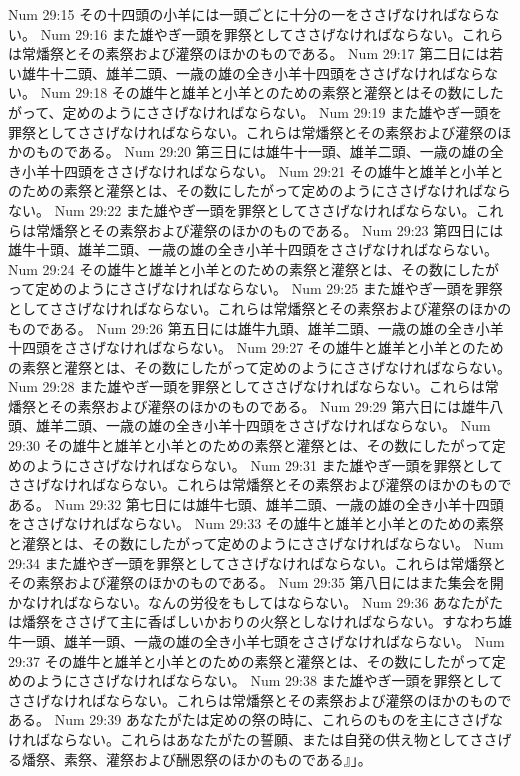 Num 29:15  その十四頭の小羊には一頭ごとに十分の一をささげなければならない。
Num 29:16  また雄やぎ一頭を罪祭としてささげなければならない。これらは常燔祭とその素祭および灌祭のほかのものである。
Num 29:17  第二日には若い雄牛十二頭、雄羊二頭、一歳の雄の全き小羊十四頭をささげなければならない。
Num 29:18  その雄牛と雄羊と小羊とのための素祭と灌祭とはその数にしたがって、定めのようにささげなければならない。
Num 29:19  また雄やぎ一頭を罪祭としてささげなければならない。これらは常燔祭とその素祭および灌祭のほかのものである。
Num 29:20  第三日には雄牛十一頭、雄羊二頭、一歳の雄の全き小羊十四頭をささげなければならない。
Num 29:21  その雄牛と雄羊と小羊とのための素祭と灌祭とは、その数にしたがって定めのようにささげなければならない。
Num 29:22  また雄やぎ一頭を罪祭としてささげなければならない。これらは常燔祭とその素祭および灌祭のほかのものである。
Num 29:23  第四日には雄牛十頭、雄羊二頭、一歳の雄の全き小羊十四頭をささげなければならない。
Num 29:24  その雄牛と雄羊と小羊とのための素祭と灌祭とは、その数にしたがって定めのようにささげなければならない。
Num 29:25  また雄やぎ一頭を罪祭としてささげなければならない。これらは常燔祭とその素祭および灌祭のほかのものである。
Num 29:26  第五日には雄牛九頭、雄羊二頭、一歳の雄の全き小羊十四頭をささげなければならない。
Num 29:27  その雄牛と雄羊と小羊とのための素祭と灌祭とは、その数にしたがって定めのようにささげなければならない。
Num 29:28  また雄やぎ一頭を罪祭としてささげなければならない。これらは常燔祭とその素祭および灌祭のほかのものである。
Num 29:29  第六日には雄牛八頭、雄羊二頭、一歳の雄の全き小羊十四頭をささげなければならない。
Num 29:30  その雄牛と雄羊と小羊とのための素祭と灌祭とは、その数にしたがって定めのようにささげなければならない。
Num 29:31  また雄やぎ一頭を罪祭としてささげなければならない。これらは常燔祭とその素祭および灌祭のほかのものである。
Num 29:32  第七日には雄牛七頭、雄羊二頭、一歳の雄の全き小羊十四頭をささげなければならない。
Num 29:33  その雄牛と雄羊と小羊とのための素祭と灌祭とは、その数にしたがって定めのようにささげなければならない。
Num 29:34  また雄やぎ一頭を罪祭としてささげなければならない。これらは常燔祭とその素祭および灌祭のほかのものである。
Num 29:35  第八日にはまた集会を開かなければならない。なんの労役をもしてはならない。
Num 29:36  あなたがたは燔祭をささげて主に香ばしいかおりの火祭としなければならない。すなわち雄牛一頭、雄羊一頭、一歳の雄の全き小羊七頭をささげなければならない。
Num 29:37  その雄牛と雄羊と小羊とのための素祭と灌祭とは、その数にしたがって定めのようにささげなければならない。
Num 29:38  また雄やぎ一頭を罪祭としてささげなければならない。これらは常燔祭とその素祭および灌祭のほかのものである。
Num 29:39  あなたがたは定めの祭の時に、これらのものを主にささげなければならない。これらはあなたがたの誓願、または自発の供え物としてささげる燔祭、素祭、灌祭および酬恩祭のほかのものである』」。
